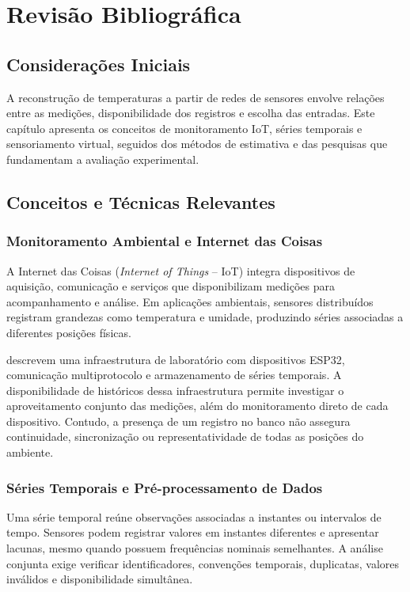 \chapter{Revisão Bibliográfica}
\label{sec:revisao}

\section{Considerações Iniciais}

A reconstrução de temperaturas a partir de redes de sensores envolve
relações entre as medições, disponibilidade dos registros e escolha das
entradas. Este capítulo apresenta os conceitos de monitoramento IoT,
séries temporais e sensoriamento virtual, seguidos dos métodos de
estimativa e das pesquisas que fundamentam a avaliação experimental.

\section{Conceitos e Técnicas Relevantes}
\label{sec:conceitos}

\subsection{Monitoramento Ambiental e Internet das Coisas}
\label{subsec:iot}

A Internet das Coisas (\textit{Internet of Things} -- IoT) integra
dispositivos de aquisição, comunicação e serviços que disponibilizam
medições para acompanhamento e análise. Em aplicações ambientais,
sensores distribuídos registram grandezas como temperatura e umidade,
produzindo séries associadas a diferentes posições físicas.

 descrevem uma infraestrutura de laboratório
com dispositivos ESP32, comunicação multiprotocolo e armazenamento de
séries temporais. A disponibilidade de históricos dessa infraestrutura
permite investigar o aproveitamento conjunto das medições, além do
monitoramento direto de cada dispositivo. Contudo, a presença de um
registro no banco não assegura continuidade, sincronização ou
representatividade de todas as posições do ambiente.

\subsection{Séries Temporais e Pré-processamento de Dados}
\label{subsec:series_temporais}

Uma série temporal reúne observações associadas a instantes ou
intervalos de tempo. Sensores podem registrar valores em instantes
diferentes e apresentar lacunas, mesmo quando possuem frequências
nominais semelhantes. A análise conjunta exige verificar identificadores,
convenções temporais, duplicatas, valores inválidos e disponibilidade
simultânea.

